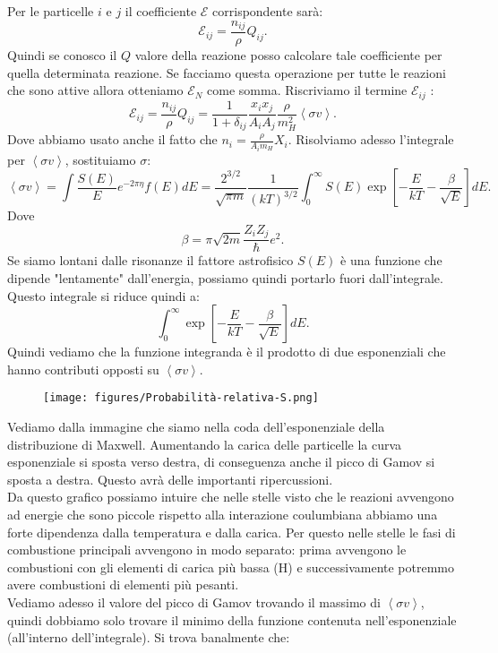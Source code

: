 Per le particelle $i$ e $j$ il coefficiente $\mathcal{E}$ corrispondente sarà:
\[
\mathcal{E}_{ij} = \frac{n_{ij}}{\rho}Q_{ij}
.\] 
Quindi se conosco il $Q$ valore della reazione posso calcolare tale coefficiente per quella determinata reazione. Se facciamo questa operazione per tutte le reazioni che sono attive allora otteniamo $\mathcal{E }_N$ come somma.
Riscriviamo il termine $\mathcal{E}_{ij}$ :
\[
\mathcal{E}_{ij} = \frac{n_{ij}}{\rho}Q_{ij} = \frac{1}{1+\delta_{ij}}\frac{x_ix_j}{A_iA_j}
\frac{\rho}{m_H^2}\left<\sigma v\right>
.\] 
Dove abbiamo usato anche il fatto che $n_i = \frac{\rho}{A_im_H}X_i$. Risolviamo adesso l'integrale per $\left<\sigma v\right>$, sostituiamo $\sigma$:
\[
    \left<\sigma v\right>=\int \frac{S(E)}{E}e^{-2\pi\eta}f(E) dE 
    = \frac{2^{3 /2}}{\sqrt{\pi m}}\frac{1}{\left(kT\right)^{3 /2}}\int_{0}^{\infty} 
    S(E) \exp\left[-\frac{E}{kT}-\frac{\beta}{\sqrt{E}}\right]dE
.\] 
Dove 
\[
\beta  = \pi\sqrt{2m} \frac{Z_iZ_j}{\hbar }e^2
.\] 
Se siamo lontani dalle risonanze il fattore astrofisico $S(E)$  è una funzione che dipende "lentamente" dall'energia, possiamo quindi portarlo fuori dall'integrale. 
\\
Questo integrale si riduce quindi a:
\[
\int_{0}^{\infty} \exp\left[-\frac{E}{kT}-\frac{\beta}{\sqrt{E}}\right]dE 
.\] 
Quindi vediamo che la funzione integranda è il prodotto di due esponenziali che hanno contributi opposti su $\left<\sigma v\right>$.
\begin{figure}[H]
    \centering
    \texttt{[image: figures/Probabilità-relativa-S.png]}
    \label{fig:figures-Probabilità-relativa-S-png}
\end{figure}
Vediamo dalla immagine che siamo nella coda dell'esponenziale della distribuzione di Maxwell. Aumentando la carica delle particelle la curva esponenziale si sposta verso destra, di conseguenza anche il picco di Gamov si sposta a destra. Questo avrà delle importanti ripercussioni.\\
Da questo grafico possiamo intuire che nelle stelle visto che le reazioni avvengono ad energie che sono piccole rispetto alla interazione coulumbiana abbiamo una forte dipendenza dalla temperatura e dalla carica. Per questo nelle stelle le fasi di combustione principali avvengono in modo separato: prima avvengono le combustioni con gli elementi di carica più bassa (H) e successivamente potremmo avere combustioni di elementi più pesanti. \\
Vediamo adesso il valore del picco di Gamov trovando il massimo di $\left<\sigma v\right>$, quindi dobbiamo solo trovare il minimo della funzione contenuta nell'esponenziale (all'interno dell'integrale). Si trova banalmente che:
